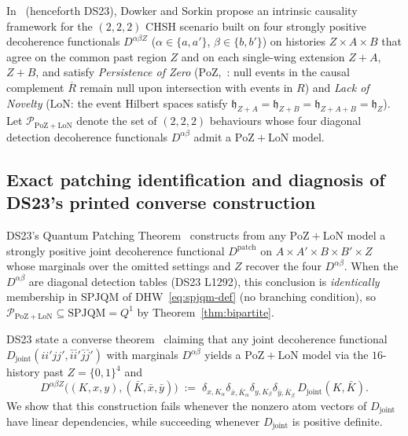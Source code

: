 \documentclass[11pt,a4paper]{article}
\theoremstyle{definition}
\theoremstyle{remark}
\newcommand{\SPJQM}{\mathrm{SPJQM}}
\newcommand{\Qone}{Q^{1}}
\newcommand{\PoZ}{\mathrm{PoZ}}
\newcommand{\LoN}{\mathrm{LoN}}
\newcommand{\PPoZ}{\mathcal{P}_{\PoZ+\LoN}}
\begin{document}
In~\cite{DowkerSorkin2023} (henceforth DS23), Dowker and Sorkin propose an intrinsic causality framework for the $(2,2,2)$ CHSH scenario built on four strongly positive decoherence functionals $D^{\alpha\beta Z}$ ($\alpha \in \{a,a'\}$, $\beta \in \{b,b'\}$) on histories $Z \times A \times B$ that agree on the common past region $Z$ and on each single-wing extension $Z+A$, $Z+B$, and satisfy \emph{Persistence of Zero} ($\PoZ$,~\cite[Def.~4]{DowkerSorkin2023}: null events in the causal complement $\overline{R}$ remain null upon intersection with events in $R$) and \emph{Lack of Novelty} ($\LoN$: the event Hilbert spaces satisfy $\mathfrak{h}_{Z+A} = \mathfrak{h}_{Z+B} = \mathfrak{h}_{Z+A+B} = \mathfrak{h}_Z$). Let $\PPoZ$ denote the set of $(2,2,2)$ behaviours whose four diagonal detection decoherence functionals $D^{\alpha\beta}$ admit a $\PoZ+\LoN$ model.

\subsection{Exact patching identification and diagnosis of DS23's printed converse construction}

DS23's Quantum Patching Theorem~\cite[Thm., L1217--1265]{DowkerSorkin2023} constructs from any $\PoZ+\LoN$ model a strongly positive joint decoherence functional $D^{\mathrm{patch}}$ on $A \times A' \times B \times B' \times Z$ whose marginals over the omitted settings and $Z$ recover the four $D^{\alpha\beta}$. When the $D^{\alpha\beta}$ are diagonal detection tables (DS23 L1292), this conclusion is \emph{identically} membership in $\SPJQM$ of DHW~\eqref{eq:spjqm-def} (no branching condition), so $\PPoZ \subseteq \SPJQM = \Qone$ by Theorem~\ref{thm:bipartite}.

DS23 state a converse theorem~\cite[Thm., L1267]{DowkerSorkin2023} claiming that any joint decoherence functional $D_{\mathrm{joint}}(ii'jj', \bar{i}\bar{i}'\bar{j}\bar{j}')$ with marginals $D^{\alpha\beta}$ yields a $\PoZ+\LoN$ model via the $16$-history past $Z = \{0,1\}^4$ and
\begin{equation}\label{eq:ds23-printed}
D^{\alpha\beta Z}\bigl((K, x, y), (\bar{K}, \bar{x}, \bar{y})\bigr) \;:=\;
\delta_{x, K_\alpha}\delta_{\bar{x}, \bar{K}_\alpha} \delta_{y, K_\beta}\delta_{\bar{y}, \bar{K}_\beta}\, D_{\mathrm{joint}}(K, \bar{K}).
\end{equation}
We show that this construction fails whenever the nonzero atom vectors of $D_{\mathrm{joint}}$ have linear dependencies, while succeeding whenever $D_{\mathrm{joint}}$ is positive definite.
\end{document}
